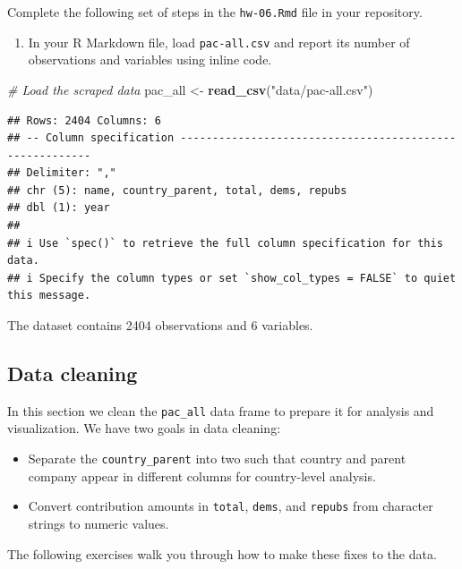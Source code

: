 \documentclass[
]{article}
\newenvironment{Shaded}{\begin{snugshade}}{\end{snugshade}}
\newcommand{\CommentTok}[1]{\textcolor[rgb]{0.56,0.35,0.01}{\textit{#1}}}
\newcommand{\FunctionTok}[1]{\textcolor[rgb]{0.13,0.29,0.53}{\textbf{#1}}}
\newcommand{\NormalTok}[1]{#1}
\newcommand{\OtherTok}[1]{\textcolor[rgb]{0.56,0.35,0.01}{#1}}
\newcommand{\StringTok}[1]{\textcolor[rgb]{0.31,0.60,0.02}{#1}}
\providecommand{\tightlist}{%
  \setlength{\itemsep}{0pt}\setlength{\parskip}{0pt}}
\begin{document}
Complete the following set of steps in the \texttt{hw-06.Rmd} file in
your repository.

\begin{enumerate}
\def\labelenumi{\arabic{enumi}.}
\tightlist
\item
  In your R Markdown file, load \texttt{pac-all.csv} and report its
  number of observations and variables using inline code.
\end{enumerate}

\begin{Shaded}
\begin{Highlighting}[]
\CommentTok{\# Load the scraped data}
\NormalTok{pac\_all }\OtherTok{\textless{}{-}} \FunctionTok{read\_csv}\NormalTok{(}\StringTok{"data/pac{-}all.csv"}\NormalTok{)}
\end{Highlighting}
\end{Shaded}

\begin{verbatim}
## Rows: 2404 Columns: 6
## -- Column specification --------------------------------------------------------
## Delimiter: ","
## chr (5): name, country_parent, total, dems, repubs
## dbl (1): year
## 
## i Use `spec()` to retrieve the full column specification for this data.
## i Specify the column types or set `show_col_types = FALSE` to quiet this message.
\end{verbatim}

The dataset contains 2404 observations and 6 variables.

\subsection{Data cleaning}\label{data-cleaning}

In this section we clean the \texttt{pac\_all} data frame to prepare it
for analysis and visualization. We have two goals in data cleaning:

\begin{itemize}
\item
  Separate the \texttt{country\_parent} into two such that country and
  parent company appear in different columns for country-level analysis.
\item
  Convert contribution amounts in \texttt{total}, \texttt{dems}, and
  \texttt{repubs} from character strings to numeric values.
\end{itemize}

The following exercises walk you through how to make these fixes to the
data.
\end{document}
